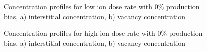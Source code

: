 \documentclass[a4paper]{article}
\begin{document}
\begin{figure}[h!]
        \caption{Concentration profiles for low ion dose rate with 0\% production bias, a) interstitial concentration, b) vacancy concentration}
        \label{figure:concentrations_ion_0_1e-6}
      \end{figure}
      \begin{figure}[h!]  %
        \centering
        \qquad
        \caption{Concentration profiles for high ion dose rate with 0\% production bias, a) interstitial concentration, b) vacancy concentration}
        \label{figure:concentrations_ion_0_1e-3}
      \end{figure}
\end{document}
